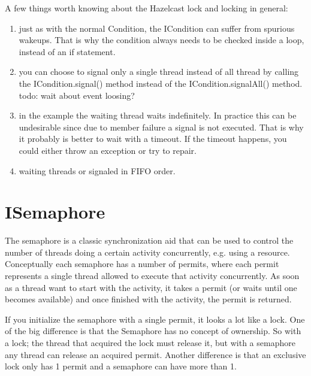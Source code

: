 A few things worth knowing about the Hazelcast lock and locking in general:
\begin{enumerate}
\item just as with the normal Condition, the ICondition can suffer from spurious wakeups. That is why the condition always needs to be checked inside a loop, instead of an if statement.
\item you can choose to signal only a single thread instead of all thread by calling the ICondition.signal() method instead of the ICondition.signalAll() method. todo: wait about event loosing?
\item in the example the waiting thread waits indefinitely. In practice this can be undesirable since due to member failure a signal is not executed. That is why it probably is better to wait with a timeout. If the timeout happens, you could either throw an exception or try to repair.
\item waiting threads or signaled in FIFO order.
\end{enumerate}

\section{ISemaphore}
The semaphore is a classic synchronization aid that can be used to control the number of threads doing a certain activity concurrently, e.g. using a resource. Conceptually each semaphore has a number of permits, where each permit represents a single thread allowed to execute that activity concurrently. As soon as a thread want to start with the activity, it takes a permit (or waits until one becomes available) and once finished with the activity, the permit is returned.

If you initialize the semaphore with a single permit, it looks a lot like a lock. One of the big difference is that the Semaphore has no concept of ownership. So with a lock; the thread that acquired the lock must release it, but with a semaphore any thread can release an acquired permit. Another difference is that an exclusive lock only has 1 permit and a semaphore can have more than 1.

